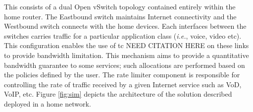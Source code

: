 This consists of a dual Open vSwitch topology contained entirely within the home router. The Eastbound switch maintains Internet connectivity and the Westbound switch connects with the home devices. Each interfaces between the switches carries traffic for a particular application class ({\em i.e.}, voice, video etc). This configuration enables the use of tc NEED CITATION HERE on these links to provide bandwidth limitation. This mechanism aims to provide a quantitative bandwidth guarantee to some services; such allocations are performed based on the policies defined by the user. The rate limiter component is responsible for controlling the rate of traffic received by a given Internet service such as VoD, VoIP, etc. Figure \ref{fig:sim} depicts the architecture of the solution described deployed in a home network.